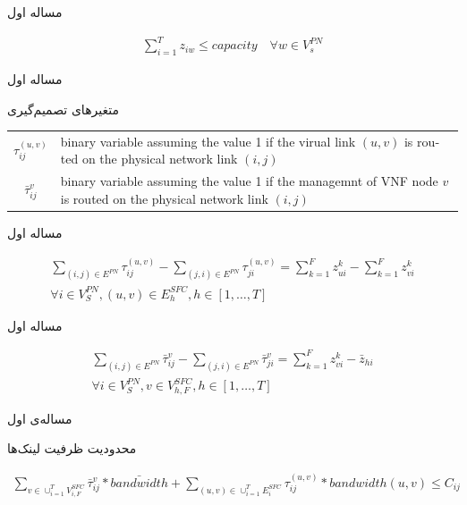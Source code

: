 \documentclass{beamer}
\begin{document}
\begin{persian}
\begin{frame}{مساله اول}
\begin{latin}
\begin{align}
		\sum_{i=1}^{T} z_{iw} \le capacity
		\quad
		\forall w \in V_{s}^{PN}
	\end{align}\end{latin}
\end{frame}
\begin{frame}{مساله اول}
	\par
	متغیرهای تصمیم‌گیری
	\begin{latin}\begin{tabular}{c p{10cm}}
		$\tau^{(u,v)}_{ij}$ & binary variable assuming the value 1 if the virual link $(u,v)$ is routed on the physical network link $(i,j)$\\
		$\bar{\tau}^{v}_{ij}$ & binary variable assuming the value 1 if the managemnt of VNF node $v$ is routed on the physical network link $(i,j)$\\
	\end{tabular}\end{latin}
\end{frame}
\begin{frame}{مساله اول}
	\par
	\begin{latin}\begin{align}
		\sum_{(i,j) \in E^{PN}} \tau_{ij}^{(u,v)} - \sum_{(j,i) \in E^{PN}} \tau_{ji}^{(u,v)} = \sum_{k=1}^{F} z_{ui}^{k} - \sum_{k=1}^{F} z_{vi}^{k} \nonumber \\
		\forall i \in V_{S}^{PN}, (u,v) \in E_{h}^{SFC}, h \in [1,\ldots, T]
	\end{align}\end{latin}
\end{frame}
\begin{frame}{مساله اول}
	\par
	\begin{latin}\begin{align}
		\sum_{(i,j) \in E^{PN}} \bar{\tau}_{ij}^{v} - \sum_{(j,i) \in E^{PN}} \bar{\tau}_{ji}^{v} = \sum_{k=1}^{F} z_{vi}^{k} - \bar{z}_{hi} \nonumber \\
		\forall i \in V_{S}^{PN}, v \in V_{h, F}^{SFC}, h \in [1,\ldots, T]
	\end{align}\end{latin}
\end{frame}
\begin{frame}{مساله‌ی اول}
	\par
	محدودیت ظرفیت لینک‌ها
	\begin{latin}\begin{align}
		\sum_{v \in \cup_{i=1}^{T} V_{i,F}^{SFC}} \bar{\tau}_{ij}^{v} * \bar{bandwidth} + \sum_{(u,v) \in \cup_{i=1}^{T} E_{i}^{SFC}} \tau_{ij}^{(u,v)} * bandwidth(u,v) \le C_{ij}

\end{align}
\end{latin}
\end{frame}
\end{persian}
\end{document}

